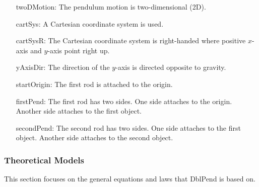 \documentclass[12pt]{article}
\begin{document}
\begin{itemize}
\item[twoDMotion:\phantomsection\label{twoDMotion}]{The pendulum motion is two-dimensional (2D).}
\item[cartSys:\phantomsection\label{cartSys}]{A Cartesian coordinate system is used.}
\item[cartSysR:\phantomsection\label{cartSysR}]{The Cartesian coordinate system is right-handed where positive $x$-axis and $y$-axis point right up.}
\item[yAxisDir:\phantomsection\label{yAxisDir}]{The direction of the $y$-axis is directed opposite to gravity.}
\item[startOrigin:\phantomsection\label{startOrigin}]{The first rod is attached to the origin.}
\item[firstPend:\phantomsection\label{firstPend}]{The first rod has two sides. One side attaches to the origin. Another side attaches to the first object.}
\item[secondPend:\phantomsection\label{secondPend}]{The second rod has two sides. One side attaches to the first object. Another side attaches to the second object.}
\end{itemize}
\subsubsection{Theoretical Models}
\label{Sec:TMs}
This section focuses on the general equations and laws that DblPend is based on.
\end{document}
